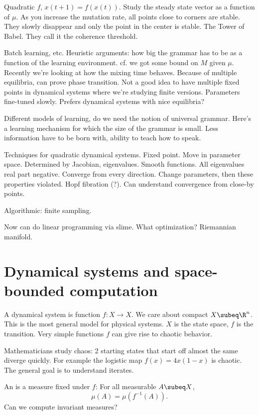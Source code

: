 Quadratic $f$, $x(t+1)=f(x(t))$. Study the steady state vector as a function of $\mu$. As you increase the mutation rate, all points close to corners are stable. They slowly disappear and only the point in the center is stable. The Tower of Babel.
They call it the coherence threshold.


Batch learning, etc. Heuristic arguments: how big the grammar has to be as a function of the learning environment. cf. we got some bound on $M$ given $\mu$. Recently we're looking at how the mixing time behaves. Because of multiple equilibria, can prove phase transition. Not a good idea to have multiple fixed points in dynamical systems where we're studying finite versions. 
Parameters fine-tuned slowly. Prefers dynamical systems with nice equilibria?

Different models of learning, do we need the notion of universal grammar. Here's a learning mechanism for which the size of the grammar is small. Less information have to be born with, ability to teach how to speak.

Techniques for quadratic dynamical systems. Fixed point. Move in parameter space. Determined by Jacobian, eigenvalues. Smooth functions. All eigenvalues real part negative. Converge from every direction. Change parameters, then these properties violated. Hopf fibration (?).
Can understand convergence from close-by points. 

Algorithmic: finite sampling. 

Now can do linear programming via slime. What optimization? Riemannian manifold.

\section{Dynamical systems and space-bounded computation}

A dynamical system is  function $f:X\to X$. We care about compact $X\subeq \R^n$. This is the most general model for physical systems. $X$ is the state space, $f$ is the transition. Very simple functions $f$ can give rise to chaotic behavior.

Mathematicians study chaos: 2 starting states that start off almost the same diverge quickly. For example the logistic map $f(x)=4x(1-x)$ is chaotic. The general goal is to understand iterates.

An  is a measure fixed under $f$: For all measurable $A\subeq X$,
\[
\mu(A) = \mu(f^{-1}(A)).
\]
Can we compute invariant measures?

